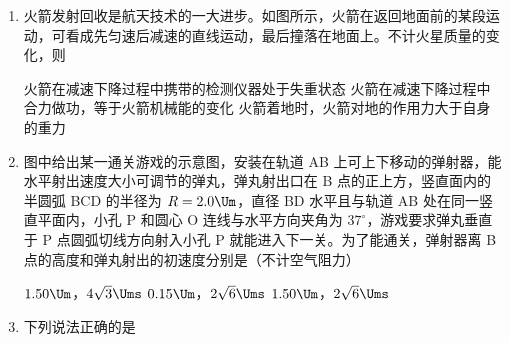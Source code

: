 \documentclass[\gkver]{gaokaozhenti}
\begin{document}
\begin{enumerate}
\item
火箭发射回收是航天技术的一大进步。如图所示，火箭在返回地面前的某段运动，可看成先匀速后减速的直线运动，最后撞落在地面上。不计火星质量的变化，则


{火箭在减速下降过程中携带的检测仪器处于失重状态}
{火箭在减速下降过程中合力做功，等于火箭机械能的变化}
{火箭着地时，火箭对地的作用力大于自身的重力}


\item
图中给出某一通关游戏的示意图，安装在轨道 AB 上可上下移动的弹射器，能水平射出速度大小可调节的弹丸，弹丸射出口在 B 点的正上方，竖直面内的半圆弧 BCD 的半径为 $R=2.0\Um$，直径 BD 水平且与轨道 AB 处在同一竖直平面内，小孔 P 和圆心 O 连线与水平方向夹角为 $37^\circ$，游戏要求弹丸垂直于 P 点圆弧切线方向射入小孔 P 就能进入下一关。为了能通关，弹射器离 B 点的高度和弹丸射出的初速度分别是（不计空气阻力）


{$1.50\Um$，$4\sqrt{3}\Ums$}
{$0.15\Um$，$2\sqrt{6}\Ums$}
{$1.50\Um$，$2\sqrt{6}\Ums$}


\item
下列说法正确的是


\end{enumerate}
\end{document}
